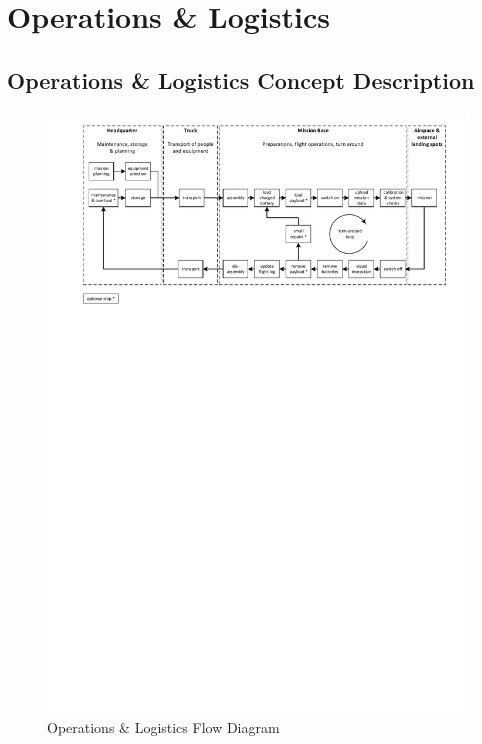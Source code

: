 \chapter{Operations \& Logistics}
\setlength{\parindent}{15pt}
\label{ch:oper_logi}

\section{Operations \& Logistics Concept Description}
\label{sec:oper_logi_conc_desc}

\begin{figure}[htb]
    \centering
    \includegraphics[width=1\textwidth]{OperationsLogistics/Figures/operations_logistics.pdf}
    \caption{Operations \& Logistics Flow Diagram}
    \label{fig:opslogsdig}
\end{figure}


